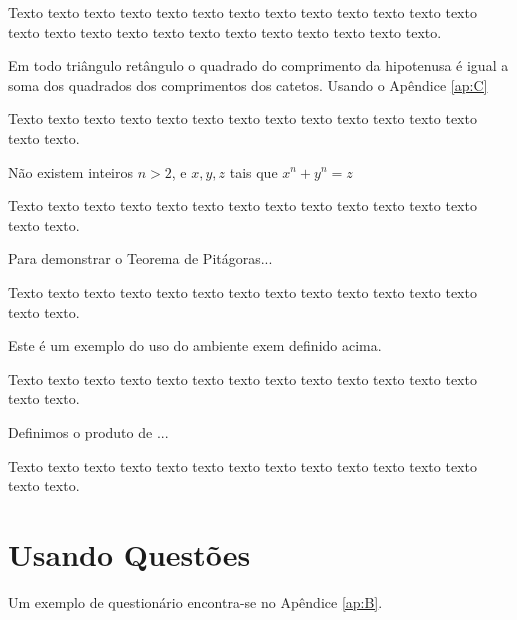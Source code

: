  Texto texto texto texto texto texto texto texto texto texto texto texto texto texto texto texto texto texto texto texto texto texto texto texto texto.

\begin{teo}[Pitágoras]
	Em todo triângulo retângulo o quadrado do comprimento da
	hipotenusa é igual a soma dos quadrados dos comprimentos dos catetos. Usando o Apêndice \ref{ap:C}
\end{teo}


Texto texto texto texto texto texto texto texto texto texto texto texto texto texto texto.

\begin{teo}[Fermat]
	Não existem inteiros $n > 2$, e $x, y, z$ tais que $x^n + y^n = z$
\end{teo}

Texto texto texto texto texto texto texto texto texto texto texto texto texto texto texto.

\begin{prop}
	Para demonstrar o Teorema de Pitágoras...
\end{prop}

Texto texto texto texto texto texto texto texto texto texto texto texto texto texto texto.

\begin{exem}
	Este é um exemplo do uso do ambiente exem definido acima.
\end{exem}

Texto texto texto texto texto texto texto texto texto texto texto texto texto texto texto.


\begin{xdefinicao}
	Definimos o produto de ...
\end{xdefinicao}

Texto texto texto texto texto texto texto texto texto texto texto texto texto texto texto.

\section{Usando Questões} 

Um exemplo de questionário encontra-se no Apêndice \ref{ap:B}.


